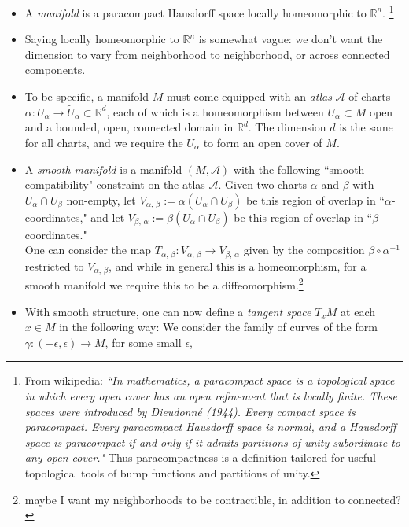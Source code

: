 \documentclass[12pt]{article}
\numberwithin{equation}{section}
\theoremstyle{definition}
\newcommand{		\1		}	{	\bm{1}					}%
\begin{document}
\begin{itemize}
\item A \emph{manifold} is a paracompact Hausdorff space locally homeomorphic to $\mathbb{R}^n$. \footnote{ From wikipedia: \emph{``In mathematics, a paracompact space is a topological space in which every open cover has an open refinement that is locally finite. These spaces were introduced by Dieudonn\'{e} (1944). Every compact space is paracompact. Every paracompact Hausdorff space is normal, and a Hausdorff space is paracompact if and only if it admits partitions of unity subordinate to any open cover."} Thus paracompactness is a definition tailored for useful topological tools of bump functions and partitions of unity.}
\item Saying locally homeomorphic to $\mathbb{R}^n$ is somewhat vague: we don't want the dimension to vary from neighborhood to neighborhood, or across connected components. 
\item To be specific, a manifold $M$ must come equipped with an \emph{atlas} $\mathcal{A}$ of charts $\alpha : U_\alpha \to \widetilde{U}_\alpha \subset \mathbb{R}^d$, each of which is a homeomorphism between $U_\alpha \subset M$ open and a bounded, open, connected domain in $\mathbb{R}^d$. The dimension $d$ is the same for all charts, and we require the $U_\alpha$ to form an open cover of $M$.  
\item A \emph{smooth manifold} is a manifold $(M,\mathcal{A})$ with the following ``smooth compatibility" constraint on the atlas $\mathcal{A}$. Given two charts $\alpha$ and $\beta$ with $U_\alpha \cap U_\beta$ non-empty, let 
\subitem $V_{\alpha, \, \beta} := \alpha ( U_\alpha \cap U_\beta)$ be this region of overlap in ``$\alpha$-coordinates," and
\subitem let $V_{\beta,\,\alpha} := \beta (U _\alpha \cap U_\beta)$ be this region of overlap in ``$\beta$-coordinates." \\
One can consider the map $T_{\alpha, \, \beta} : V_{\alpha,\,\beta}  \to V_{\beta,\,\alpha} $ given by the composition $\beta \circ \alpha^{-1}$ restricted to $V_{\alpha,\,\beta}$, and while in general this is a homeomorphism, for a smooth manifold we require this to be a diffeomorphism.\footnote{maybe I want my neighborhoods to be contractible, in addition to connected? }
\item With smooth structure, one can now define a \emph{tangent space} $T_xM$ at each $x \in M$ in the following way:
\subitem We consider the family of curves of the form $\gamma : (-\epsilon, \epsilon) \to M$, for some small $\epsilon$, 
$$
$$
\end{itemize}
\end{document}
